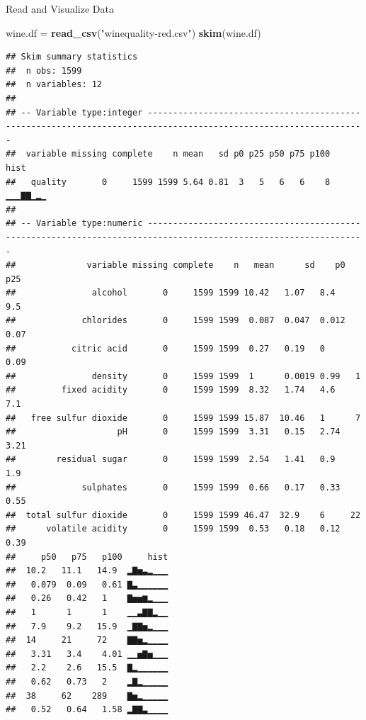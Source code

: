 \documentclass[ignorenonframetext,]{beamer}
\newenvironment{Shaded}{\begin{snugshade}}{\end{snugshade}}
\newcommand{\KeywordTok}[1]{\textcolor[rgb]{0.13,0.29,0.53}{\textbf{#1}}}
\newcommand{\StringTok}[1]{\textcolor[rgb]{0.31,0.60,0.02}{#1}}
\newcommand{\NormalTok}[1]{#1}
\begin{document}
\begin{frame}[fragile]{Read and Visualize Data}

\begin{Shaded}
\begin{Highlighting}[]
\NormalTok{wine.df =}\StringTok{ }\KeywordTok{read_csv}\NormalTok{(}\StringTok{"winequality-red.csv"}\NormalTok{)}
\KeywordTok{skim}\NormalTok{(wine.df)}
\end{Highlighting}
\end{Shaded}

\begin{verbatim}
## Skim summary statistics
##  n obs: 1599 
##  n variables: 12 
## 
## -- Variable type:integer -----------------------------------------------------------------------------------------------------------------
##  variable missing complete    n mean   sd p0 p25 p50 p75 p100     hist
##   quality       0     1599 1599 5.64 0.81  3   5   6   6    8 ▁▁▁▇▇▁▂▁
## 
## -- Variable type:numeric -----------------------------------------------------------------------------------------------------------------
##              variable missing complete    n   mean      sd    p0   p25
##               alcohol       0     1599 1599 10.42   1.07   8.4    9.5 
##             chlorides       0     1599 1599  0.087  0.047  0.012  0.07
##           citric acid       0     1599 1599  0.27   0.19   0      0.09
##               density       0     1599 1599  1      0.0019 0.99   1   
##         fixed acidity       0     1599 1599  8.32   1.74   4.6    7.1 
##   free sulfur dioxide       0     1599 1599 15.87  10.46   1      7   
##                    pH       0     1599 1599  3.31   0.15   2.74   3.21
##        residual sugar       0     1599 1599  2.54   1.41   0.9    1.9 
##             sulphates       0     1599 1599  0.66   0.17   0.33   0.55
##  total sulfur dioxide       0     1599 1599 46.47  32.9    6     22   
##      volatile acidity       0     1599 1599  0.53   0.18   0.12   0.39
##     p50   p75   p100     hist
##  10.2   11.1   14.9  ▂▇▅▃▂▁▁▁
##   0.079  0.09   0.61 ▇▃▁▁▁▁▁▁
##   0.26   0.42   1    ▇▅▅▆▂▁▁▁
##   1      1      1    ▁▁▃▇▇▂▁▁
##   7.9    9.2   15.9  ▁▇▇▅▂▁▁▁
##  14     21     72    ▇▇▅▂▁▁▁▁
##   3.31   3.4    4.01 ▁▁▅▇▅▁▁▁
##   2.2    2.6   15.5  ▇▂▁▁▁▁▁▁
##   0.62   0.73   2    ▂▇▂▁▁▁▁▁
##  38     62    289    ▇▅▂▁▁▁▁▁
##   0.52   0.64   1.58 ▂▇▇▃▁▁▁▁
\end{verbatim}

\end{frame}
\end{document}
